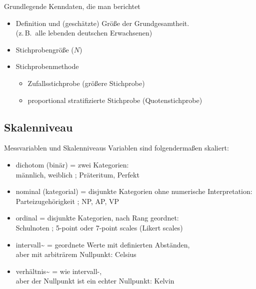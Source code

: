 \begin{frame}
  {Grundlegende Kenndaten, die man berichtet}
  \begin{itemize}[<+->]
    \item Definition und (geschätzte) Größe der Grundgesamtheit.\\
    (z.\,B.\ alle lebenden deutschen Erwachsenen)
    \item Stichprobengröße ($N$)
    \item Stichprobenmethode
      \begin{itemize}[<+->]
	\item Zufallsstichprobe (größere Stichprobe)
	\item proportional stratifizierte Stichprobe (Quotenstichprobe)
      \end{itemize}
  \end{itemize}
\end{frame}


\subsection{Skalenniveau}

\begin{frame}
  {Messvariablen und Skalenniveaus}
  Variablen sind folgendermaßen \alert{skaliert}:
  \begin{itemize}[<+->]
    \item \alert{dichotom} (binär) = zwei Kategorien:\\
      männlich, weiblich ; Präteritum, Perfekt
    \item \alert{nominal} (kategorial) = disjunkte Kategorien ohne numerische Interpretation:\\
      Parteizugehörigkeit ; NP, AP, VP
    \item \alert{ordinal} = disjunkte Kategorien, nach Rang geordnet:\\
      Schulnoten ; 5-point oder 7-point scales (Likert scales)\\
    \item \alert{intervall\textasciitilde} = geordnete Werte mit definierten Abständen,\\
      aber mit arbiträrem Nullpunkt: Celsius
    \item \alert{verhältnis\textasciitilde} = wie intervall-,\\
      aber der Nullpunkt ist ein echter Nullpunkt: Kelvin
  \end{itemize}
\end{frame}

